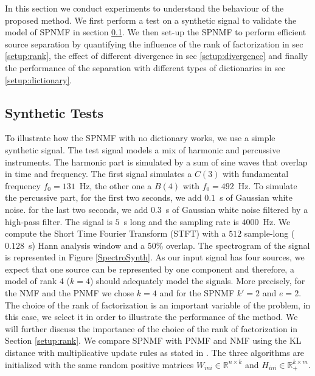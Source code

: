 \documentclass[journal]{IEEEtran}
\begin{document}
In this section we conduct experiments to understand the behaviour of the proposed method. We first perform a test on a synthetic signal to validate the model of SPNMF in section \ref{SynthTest}. We then set-up the SPNMF to perform efficient source separation by quantifying the influence of the rank of factorization in sec \ref{setup:rank}, the effect of different divergence in sec \ref{setup:divergence} and finally the performance of the separation with different types of dictionaries in sec \ref{setup:dictionary}.


\subsection{Synthetic Tests}\label{SynthTest}

To illustrate how the SPNMF with no dictionary works, we use a simple synthetic signal. The test signal models a mix of harmonic and percussive instruments. The harmonic part is simulated by a sum of sine waves that overlap in time and frequency. The first signal simulates a $C(3)$ with fundamental frequency $f_0 = 131$~Hz, the other one a $B(4)$ with $f_0 = 492$~Hz. To simulate the percussive part, for the first two seconds, we add $0.1$~s of Gaussian white noise. for the last two seconds, we add $0.3$~s of Gaussian white noise filtered by a high-pass filter. The signal is $5$~s long and the sampling rate is $4000$~Hz. We compute the Short Time Fourier Transform (STFT) with a $512$ sample-long ($0.128$~s) Hann analysis window and a $50\%$ overlap. The spectrogram of the signal is represented in Figure \ref{SpectroSynth}. As our input signal has four sources, we expect that one source can be represented by one component and therefore, a model of rank 4 ($k=4$) should adequately model the signals. More precisely, for the NMF and the PNMF we chose $k=4$ and for the SPNMF $k'=2$ and $e=2$. The choice of the rank of factorization is an important variable of the problem, in this case, we select it in order to illustrate the performance of the method. We will further discuss the importance of the choice of the rank of factorization in Section \ref{setup:rank}. We compare SPNMF with PNMF and NMF using the KL distance with multiplicative update rules as stated in \cite{fevotte2009nonnegative}. The three algorithms are initialized with the same random positive matrices $W_{ini} \in \mathbb{R}^{n \times k}$  and $ H_{ini} \in \mathbb{R}^{k \times m}_{+} $.
\end{document}
